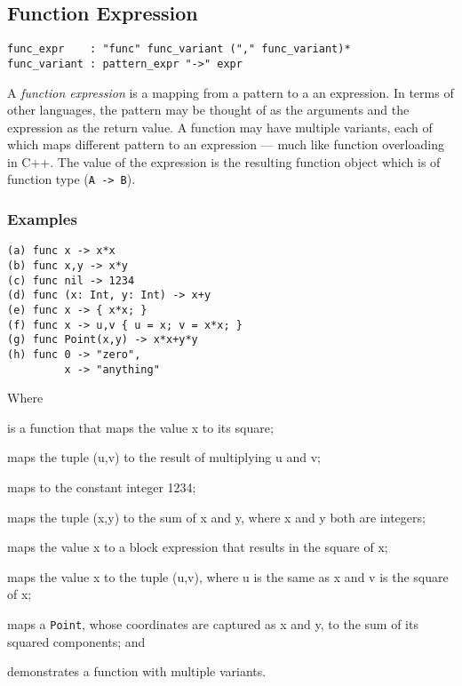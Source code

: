\subsection{Function Expression}

\begin{lstlisting}[language=EBNF]
func_expr    : "func" func_variant ("," func_variant)*
func_variant : pattern_expr "->" expr
\end{lstlisting}

A \emph{function expression} is a mapping from a pattern to a an expression. In
terms of other languages, the pattern may be thought of as the arguments and the
expression as the return value. A function may have multiple variants, each
of which maps different pattern to an expression --- much like function
overloading in C++. The value of the expression is the resulting function object
which is of function type (\lstinline{A -> B}).

\subsubsection{Examples}

\begin{lstlisting}
(a) func x -> x*x
(b) func x,y -> x*y
(c) func nil -> 1234
(d) func (x: Int, y: Int) -> x+y
(e) func x -> { x*x; }
(f) func x -> u,v { u = x; v = x*x; }
(g) func Point(x,y) -> x*x+y*y
(h) func 0 -> "zero",
         x -> "anything"
\end{lstlisting}

Where \begin{exdesc}
	\item is a function that maps the value x to its square;
	\item maps the tuple (u,v) to the result of multiplying u and v;
	\item maps to the constant integer 1234;
	\item maps the tuple (x,y) to the sum of x and y, where x and y both are
	      integers;
	\item maps the value x to a block expression that results in the square of
	      x;
	\item maps the value x to the tuple (u,v), where u is the same as x and v is
	      the square of x;
	\item maps a \lstinline{Point}, whose coordinates are captured as x and y,
	      to the sum of its squared components; and
	\item demonstrates a function with multiple variants.
\end{exdesc}
